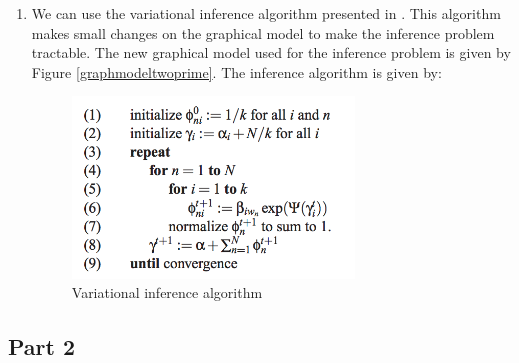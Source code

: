 \documentclass{article}
\begin{document}
\begin{enumerate}
\begin{enumerate}
\item
We can use the variational inference algorithm presented in \cite{lda}. This algorithm makes small changes on the graphical model to make the inference problem tractable. The new graphical model used for the inference problem is given by Figure \ref{graphmodeltwoprime}. The inference algorithm \cite{lda} is given by:
\begin{figure}[ht!]
\centering
\includegraphics[width=75mm]{1_1_2inf.png}
\caption{Variational inference algorithm}
\label{varinfalgorithm}
\end{figure}

\end{enumerate}

\end{enumerate}

\newpage
\subsection*{Part 2}
\end{document}
